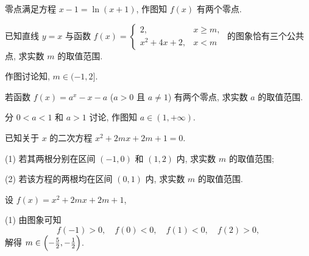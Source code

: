   \beginsolution
    零点满足方程 $x-1=\ln(x+1)$, 作图知 $f(x)$ 有两个零点.
  \endsolution
  
  \begin{exercise}
    已知直线 $y=x$ 与函数 $f(x)=\begin{cases}
      2, & x\geqslant m,\\
      x^2+4x+2, & x<m \end{cases}$
    的图象恰有三个公共点, 求实数 $m$ 的取值范围.
  \end{exercise}

  \beginsolution
    作图讨论知, $m\in(-1,2]$.
  \begin{figure}[htb]
    \small
    \centering
  \end{figure}
  \endsolution
  
  \begin{exercise}
    若函数 $f(x)=a^x -x-a$ ($a>0$ 且 $a\neq1$) 有两个零点,
    求实数 $a$ 的取值范围.
  \end{exercise}

  \beginsolution
    分 $0<a<1$ 和 $a>1$ 讨论, 作图知 $a\in(1,+\infty)$.
  \endsolution
  
  \begin{exercise}
    已知关于 $x$ 的二次方程 $x^2 +2mx+2m+1=0$.
    
    (1) 若其两根分别在区间 $(-1,0)$ 和 $(1,2)$ 内,
    求实数 $m$ 的取值范围;
    
    (2) 若该方程的两根均在区间 $(0,1)$ 内, 求实数 $m$ 的取值范围.
  \end{exercise}
  
  \beginsolution
    设 $f(x)=x^2 +2mx+2m+1$,
    
    (1) 由图象可知
    \[f(-1)>0,\quad f(0)<0,\quad f(1)<0,\quad f(2)>0,\]
    解得 $m\in\Bigl(-\frac52,-\frac12\Bigr)$.
    
